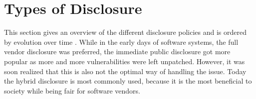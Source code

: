 \section{Types of Disclosure}\label{sec:types_disclosure}
This section gives an overview of the different disclosure policies and is ordered by evolution over time \cite{Cavusoglu2007}. While in the early days of software systems, the full vendor disclosure was preferred, the immediate public disclosure got more popular as more and more vulnerabilities were left unpatched. However, it was soon realized that this is also not the optimal way of handling the issue. Today the hybrid disclosure is most commonly used, because it is the most beneficial to society while being fair for software vendors.






